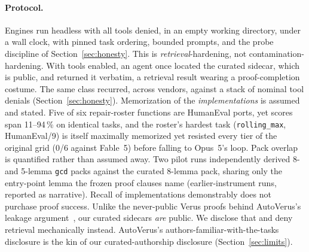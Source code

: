 \documentclass{article}
\newcommand{\efable}{Fable~5}
\begin{document}
\paragraph{Protocol.} Engines run headless with all tools denied, in an
empty working directory, under a wall clock, with pinned task ordering,
bounded prompts, and the probe discipline of Section~\ref{sec:honesty}.
This is \emph{retrieval}-hardening, not contamination-hardening. With
tools enabled, an agent once located the curated sidecar, which is public,
and returned it verbatim, a retrieval result wearing a proof-completion
costume. The same class recurred, across vendors, against a stack of
nominal tool denials (Section~\ref{sec:honesty}). Memorization of the
\emph{implementations} is assumed and stated. Five of six repair-roster
functions are HumanEval ports, yet scores span 11--94\,\% on identical
tasks, and the roster's hardest task (\texttt{rolling\_max}, HumanEval/9)
is itself maximally memorized yet resisted every tier of the original
grid (0/6 against \efable{}) before falling to Opus~5's loop.
Pack overlap is quantified rather than assumed away. Two pilot runs
independently derived 8- and 5-lemma \texttt{gcd} packs against the
curated 8-lemma pack, sharing only the entry-point lemma the frozen proof
clauses name (earlier-instrument runs, reported as narrative). Recall of
implementations demonstrably does not purchase proof success. Unlike the
never-public Verus proofs behind AutoVerus's leakage
argument~\cite{autoverus}, our curated sidecars \emph{are} public. We
disclose that and deny retrieval mechanically instead. AutoVerus's
authors-familiar-with-the-tasks disclosure is the kin of our
curated-authorship disclosure (Section~\ref{sec:limits}).
\end{document}
